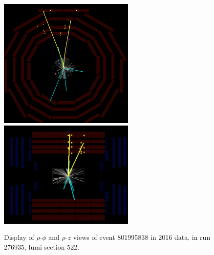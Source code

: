 \begin{figure}[htpb]
  \centering
  \includegraphics[width=0.6\textwidth]{figures/displaced/event-276935_801995838_522_RhoPhi.png}
  \includegraphics[width=0.6\textwidth]{figures/displaced/event-276935_801995838_522_RhoZ.png}
  \caption{Display of $\rho$-$\phi$ and $\rho$-$z$ views of event 801995838 in 2016 data, in run 276935, lumi section 522.}
  \label{fig:dd:event-522}
\end{figure}

